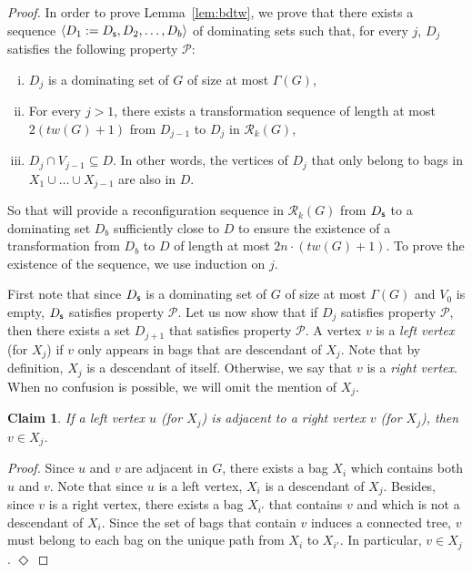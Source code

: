 \documentclass[10pt]{article}
\newtheorem{claim}{Claim}
\newcommand{\source}{{\sf s}}
\newenvironment{proofclaim}[1][]%
    {\noindent \emph{Proof.} {}{#1}{}}{\hfill
    $\Diamond$\vspace{1em}}
\begin{document}
\begin{proof}
In order to prove Lemma~\ref{lem:bdtw}, we prove that there exists a sequence $\langle D_1:=D_\source,D_2,\ldots,D_b \rangle$ of dominating sets such that, for every $j$, $D_j$ satisfies the following property $\mathcal{P}$:
\begin{enumerate}[(i)]
    \item $D_j$ is a dominating set of $G$ of size at most $\Gamma(G)$,
    \item For every $j>1$, there exists a transformation sequence of length at most $2(tw(G)+1)$ from $D_{j-1}$ to $D_{j}$ in $\mathcal{R}_k(G)$,
    \item $D_j \cap V_{j-1} \subseteq D$. In other words, the vertices of $D_j$ that only belong to bags in $X_1 \cup \ldots \cup X_{j-1}$ are also in $D$.
\end{enumerate}
So that will provide a reconfiguration sequence in $\mathcal{R}_k(G)$ from $D_\source$ to a dominating set $D_b$ sufficiently close to $D$ to ensure the existence of a transformation from $D_b$ to $D$ of length at most $2n \cdot (tw(G)+1)$. To prove the existence of the sequence, we use induction on $j$.

First note that since $D_\source$ is a dominating set of $G$ of size at most $\Gamma(G)$ and $V_0$ is empty, $D_\source$ satisfies property $\mathcal{P}$. 
Let us now show that if $D_j$ satisfies property $\mathcal{P}$, then there exists a set $D_{j+1}$ that satisfies property $\mathcal{P}$. A vertex $v$ is a \emph{left vertex} (for $X_j$) if $v$ only appears in bags that are descendant of $X_j$. Note that by definition, $X_j$ is a descendant of itself. Otherwise, we say that $v$ is a \emph{right vertex}. When no confusion is possible, we will omit the mention of $X_j$.

\begin{claim}\label{rk:LeftRight}
If a left vertex $u$ (for $X_j$) is adjacent to a right vertex $v$ (for $X_j$), then $v\in X_j$.
\end{claim}

\begin{proofclaim}
Since $u$ and $v$ are adjacent in $G$, there exists a bag $X_i$ which contains both $u$ and $v$. Note that since $u$ is a left vertex, $X_i$ is a descendant of $X_j$. Besides, since $v$ is a right vertex, there exists a bag $X_{i'}$ that contains $v$ and which is not a descendant of $X_i$. Since the set of bags that contain $v$ induces a connected tree, $v$ must belong to each bag on the unique path from $X_i$ to $X_{i'}$. In particular, $v \in X_j$.
\end{proofclaim}


\end{proof}
\end{document}
